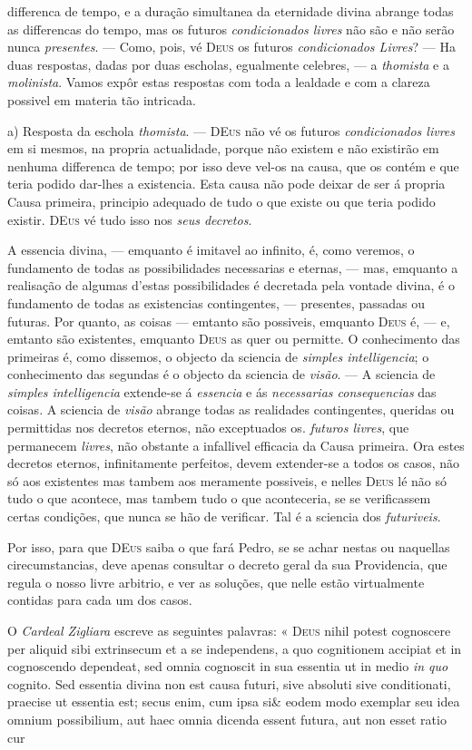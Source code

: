 differenca de tempo, e a duração simultanea da eternidade divina abrange todas as differencas do tempo, mas os futuros \emph{condicionados livres} não são e não serão nunca \emph{presentes}. --- Como, pois, vé \textsc{Deus} os futuros \emph{condicionados Livres}? --- Ha duas respostas, dadas por duas escholas, egualmente celebres, --- a \emph{thomista} e a \emph{molinista}. Vamos expôr estas respostas com toda a lealdade e com a clareza possivel em materia tão intricada.\par a) Resposta da eschola \emph{thomista}. --- \textsc{DEus} não vé os futuros \emph{condicionados livres} em si mesmos, na propria actualidade, porque não existem e não existirão em nenhuma differenca de tempo; por isso deve vel-os na causa, que os contém e que teria podido dar-lhes a existencia. Esta causa não pode deixar de ser á propria Causa primeira, principio adequado de tudo o que existe ou que teria podido existir. \textsc{DEus} vé tudo isso nos \emph{seus decretos}.\par A essencia divina, --- emquanto é imitavel ao infinito, é, como veremos, o fundamento de todas as possibilidades necessarias e eternas, --- mas, emquanto a realisação de algumas d'estas possibilidades é decretada pela vontade divina, é o fundamento de todas as existencias contingentes, --- presentes, passadas ou futuras. Por quanto, as coisas --- emtanto são possiveis, emquanto \textsc{Deus} é, --- e, emtanto são existentes, emquanto \textsc{Deus} as quer ou permitte. O conhecimento das primeiras é, como dissemos, o objecto da sciencia de \emph{simples intelligencia}; o conhecimento das segundas é o objecto da sciencia de \emph{visão}. --- A sciencia de \emph{simples intelligencia} extende-se á \emph{essencia} e ás \emph{necessarias consequencias} das coisas. A sciencia de \emph{visão} abrange todas as realidades contingentes, queridas ou permittidas nos decretos eternos, não exceptuados os. \emph{futuros livres}, que permanecem \emph{livres}, não obstante a infallivel efficacia da Causa primeira. Ora estes decretos eternos, infinitamente perfeitos, devem extender-se a todos os casos, não só aos existentes mas tambem aos meramente possiveis, e nelles \textsc{Deus} lé não só tudo o que acontece, mas tambem tudo o que aconteceria, se se verificassem certas condições, que nunca se hão de verificar. Tal é a sciencia dos \emph{futuriveis}.\par Por isso, para que \textsc{DEus} saiba o que fará Pedro, se se achar nestas ou naquellas cirecumstancias, deve apenas consultar o decreto geral da sua Providencia, que regula o nosso livre arbitrio, e ver as soluções, que nelle estão virtualmente contidas para cada um dos casos.\par O \emph{Cardeal Zigliara} escreve as seguintes palavras: « \textsc{Deus} nihil potest cognoscere per aliquid sibi extrinsecum et a se independens, a quo cognitionem accipiat et in cognoscendo dependeat, sed omnia cognoscit in sua essentia ut in medio \emph{in quo} cognito. Sed essentia divina non est causa futuri, sive absoluti sive conditionati, praecise ut essentia est; secus enim, cum ipsa si\& eodem modo exemplar seu idea omnium possibilium, aut haec omnia dicenda essent futura, aut non esset ratio cur 